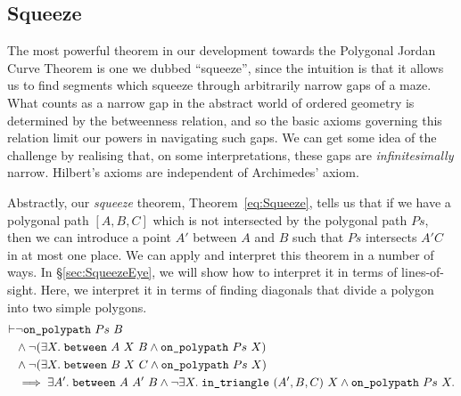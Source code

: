 \subsection{Squeeze}\label{sec:Squeeze}
The most powerful theorem in our development towards the Polygonal Jordan Curve Theorem is one we dubbed ``squeeze'', since the intuition is that it allows us to find segments which squeeze through arbitrarily narrow gaps of a maze. What counts as a narrow gap in the abstract world of ordered geometry is  determined by the betweenness relation, and so the basic axioms governing this relation limit our powers in navigating such gaps. We can get some idea of the challenge by realising that, on some interpretations, these gaps are \emph{infinitesimally} narrow. Hilbert's axioms are independent of Archimedes' axiom.

Abstractly, our \emph{squeeze} theorem, Theorem~\ref{eq:Squeeze}, tells us that if we have a polygonal path $[A,B,C]$ which is not intersected by the polygonal path $Ps$, then we can introduce a point $A'$ between $A$ and $B$ such that $Ps$ intersects $A'C$ in at most one place. We can apply and interpret this theorem in a number of ways. In \S\ref{sec:SqueezeEye}, we will show how to interpret it in terms of lines-of-sight. Here, we interpret it in terms of finding diagonals that divide a polygon into two simple polygons.
\begin{equation}\label{eq:Squeeze}
  \begin{aligned}
    \vdash&\neg\texttt{on\_polypath}\ Ps\ B\\
    &\wedge \neg(\exists X.\; \texttt{between}\ A\ X\ B \wedge \texttt{on\_polypath}\ Ps\ X)\\
    &\wedge \neg(\exists X.\; \texttt{between}\ B\ X\ C \wedge \texttt{on\_polypath}\ Ps\ X)\\
    &\implies \exists A'.\; \texttt{between}\ A\ A'\ B \wedge \neg\exists X.\; \texttt{in\_triangle}\ (A',B,C)\ X\wedge \texttt{on\_polypath}\ Ps\ X.
  \end{aligned}
\end{equation}


